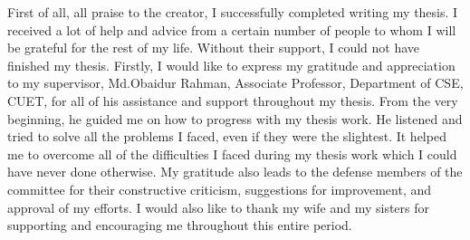 \begin{acknowledgements}
First of all, all praise to the creator, I successfully completed writing my thesis.
I received a lot of help and advice from a certain number of people to whom I
will be grateful for the rest of my life. Without their support, I could not have
finished my thesis. Firstly, I would like to express my gratitude and appreciation
to my supervisor, Md.Obaidur Rahman, Associate Professor, Department of CSE, CUET, for
all of his assistance and support throughout my thesis. From the very beginning,
he guided me on how to progress with my thesis work. He listened and tried
to solve all the problems I faced, even if they were the slightest. It helped me
to overcome all of the difficulties I faced during my thesis work which I could have never done otherwise. My gratitude also leads to the defense members of the committee for their constructive criticism, suggestions for improvement, and
approval of my efforts. I would also like to thank my wife and my sisters for supporting and
encouraging me throughout this entire period.

\end{acknowledgements}